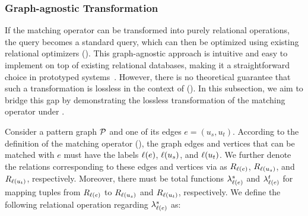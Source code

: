
\subsubsection{Graph-agnostic Transformation}
\label{sec:intuitive-method}
If the matching operator can be transformed into purely relational operations, the \spjm query becomes a
standard \spj query, which can then be optimized using existing relational optimizers (). This graph-agnostic
approach is intuitive and easy to implement on top of existing relational databases, making it a straightforward
choice in prototyped systems~\cite{apache-age,DuckPGQ,DuckPGQ-VLDB}. However, there is no theoretical guarantee that
such a transformation is lossless in the context of \rgmapping (). In this subsection,
we aim to bridge this gap by demonstrating the lossless transformation of the matching
operator under \rgmapping.

Consider a pattern graph $\mathcal{P}$ and one of its edges $e = (u_s, u_t)$. According to the definition of the matching operator (), the graph edges and vertices that can be matched with $e$ must have the labels $\mathcal{\ell}(e)$, $\mathcal{\ell}(u_s)$, and $\mathcal{\ell}(u_t)$. We further denote the relations corresponding to these edges and vertices via \rgmapping as $R_{\mathcal{\ell}(e)}$, $R_{\mathcal{\ell}(u_s)}$, and $R_{\mathcal{\ell}(u_t)}$, respectively. Moreover, there must be total functions $\lambda_{\mathcal{\ell}(e)}^s$ and $\lambda_{\mathcal{\ell}(e)}^t$ for mapping tuples from $R_{\mathcal{\ell}(e)}$ to $R_{\mathcal{\ell}(u_s)}$ and $R_{\mathcal{\ell}(u_t)}$, respectively. We define the following \EVjoin relational operation regarding $\lambda_{\mathcal{\ell}(e)}^s$ as:

